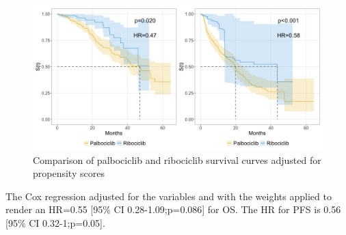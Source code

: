 \begin{figure}[ht]
  \centering

  \caption{Comparison of palbociclib and ribociclib survival curves adjusted for propensity scores  }\label{fig:propensity} 
  \includegraphics[scale=0.42]{figures/propensity_score_both.jpeg}%

\end{figure}

The Cox regression adjusted for the variables and with the weights applied to render an HR=0.55 [95\% CI 0.28-1.09;p=0.086] for OS. The HR for PFS is 0.56 [95\% CI 0.32-1;p=0.05].